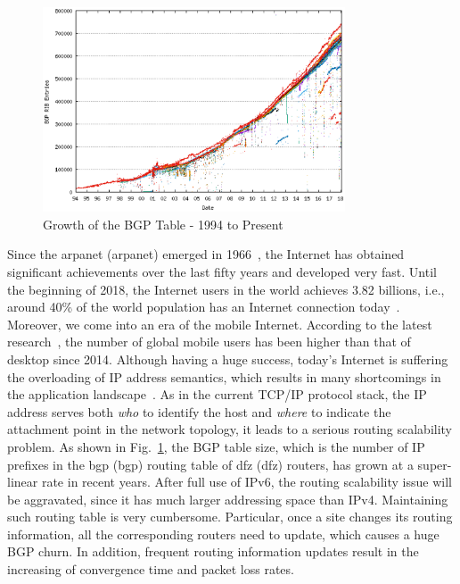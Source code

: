 \begin{figure}[t]
	\centering
	\includegraphics[width=0.8\textwidth]{Pics/Growth_BGP_Table.eps}
	\caption{Growth of the BGP Table - 1994 to Present}
	\label{Growth_BGP_Table}
\end{figure}
Since the \acrshort{arpanet} (\acrlong{arpanet}) emerged in 1966~\cite{marill1966toward}, the Internet has obtained significant achievements over the last fifty years and developed very fast. Until the beginning of 2018, the Internet users in the world achieves 3.82 billions, i.e., around 40\% of the world population has an Internet connection today~\cite{InternetLiveStats}. Moreover, we come into an era of the mobile Internet. According to the latest research~\cite{SmartInsights}, the number of global mobile users has been higher than that of desktop since 2014. Although having a huge success, today's Internet is suffering the overloading of IP address semantics, which results in many shortcomings in the application landscape~\cite{feng2017locator}. As in the current TCP/IP protocol stack, the IP address serves both \emph{who} to identify the host and \emph{where} to indicate the attachment point in the network topology, it leads to a serious routing scalability problem. As shown in Fig.~\ref{Growth_BGP_Table}, the BGP table size, which is the number of IP prefixes in the \acrshort{bgp} (\acrlong{bgp}) routing table of \acrshort{dfz} (\acrlong{dfz}) routers, has grown at a super-linear rate in recent years. After full use of IPv6, the routing scalability issue will be aggravated, since it has much larger addressing space than IPv4. Maintaining such routing table is very cumbersome. Particular, once a site changes its routing information, all the corresponding routers need to update, which causes a huge BGP churn. In addition, frequent routing information updates result in the increasing of convergence time and packet loss rates.

